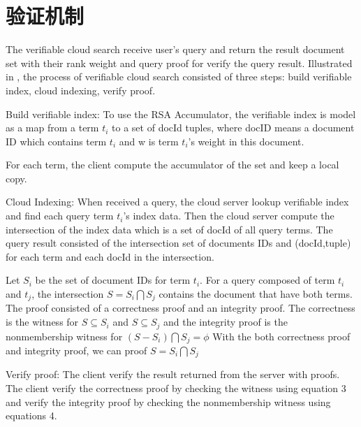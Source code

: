 \section{验证机制}
The verifiable cloud search receive user's query and return the result document set with their rank weight and query proof for verify the query result. Illustrated in \cite{verifiableindex}, the process of verifiable cloud search consisted of three steps: build verifiable index, cloud indexing, verify proof.

Build verifiable index: 
To use the RSA Accumulator, the verifiable index is model as a map from a term $t_i$ to a set of docId tuples, where docID means a document ID which contains term $t_i$ and w is term $t_i$'s weight in this document.

For each term, the client compute the accumulator of the set and keep a local copy.

Cloud Indexing:
When received a query, the cloud server lookup verifiable index and find each query term $t_i$'s index data. Then the cloud server compute the intersection of the index data which is a set of docId of all query terms. The query result consisted of the intersection set of documents IDs and (docId,tuple) for each term and each docId in the intersection.

Let $S_i$ be the set of document IDs for term $t_i$. For a query composed of term $t_i$ and $t_j$, the intersection $S = S_i \bigcap S_j$ contains the document that have both terms.
The proof consisted of a correctness proof and an integrity proof. The correctness is the witness for $S \subseteq S_i$ and $S \subseteq S_j$ and the integrity proof is the nonmembership witness for $(S - S_i) \bigcap S_j = \phi$
With the both correctness proof and integrity proof, we can proof $S = S_i \bigcap S_j$

Verify proof:
The client verify the result returned from the server with proofs. The client verify the correctness proof by checking the witness using equation 3 and verify the integrity proof by checking the nonmembership witness using equations 4.

